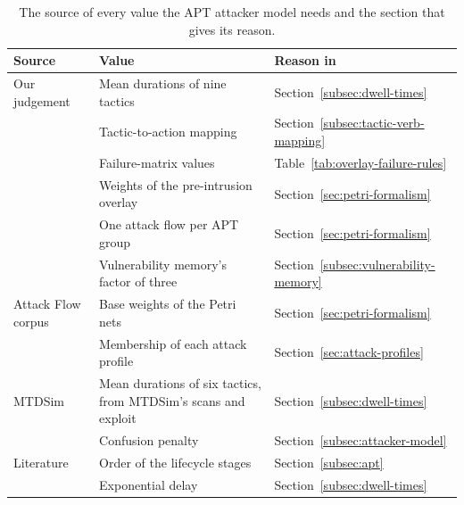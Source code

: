 \begin{table}[!htbp]
  \centering
  \caption[Each value of the APT attacker model and where it comes from]{The
  source of every value the APT attacker model needs and the section that gives
  its reason.}
  \label{tab:value-bases}
  \tablestyle
  \begin{tabular}{@{}P{3.0cm}P{10.0cm}P{1.95cm}@{}}  %
    \toprule
    Source & Value & Reason in \\
    \midrule
    Our judgement & Mean durations of nine tactics & Section~\ref{subsec:dwell-times} \\
     & Tactic-to-action mapping & Section~\ref{subsec:tactic-verb-mapping} \\
     & Failure-matrix values & Table~\ref{tab:overlay-failure-rules} \\
     & Weights of the pre-intrusion overlay & Section~\ref{sec:petri-formalism} \\
     & One attack flow per APT group & Section~\ref{sec:petri-formalism} \\
     & Vulnerability memory's factor of three & Section~\ref{subsec:vulnerability-memory} \\
    \addlinespace
    Attack Flow corpus & Base weights of the Petri nets & Section~\ref{sec:petri-formalism} \\
     & Membership of each attack profile & Section~\ref{sec:attack-profiles} \\
    \addlinespace
    MTDSim & Mean durations of six tactics, from MTDSim's scans and exploit & Section~\ref{subsec:dwell-times} \\
     & Confusion penalty & Section~\ref{subsec:attacker-model} \\
    \addlinespace
    Literature & Order of the lifecycle stages & Section~\ref{subsec:apt} \\
     & Exponential delay & Section~\ref{subsec:dwell-times} \\
    \bottomrule
  \end{tabular}
\end{table}
